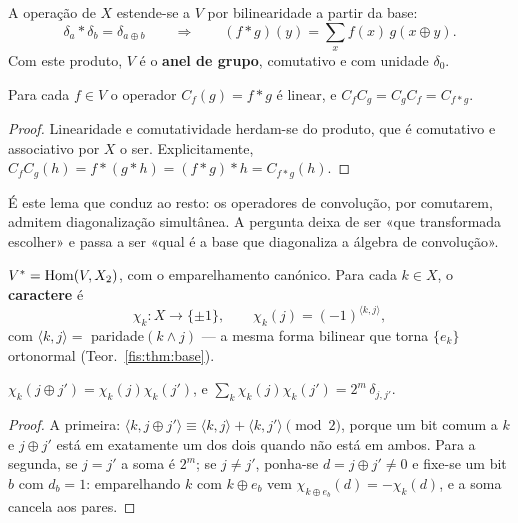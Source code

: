 \documentclass[livro.tex]{subfiles}
\begin{document}
\begin{definicao}[convolução]\label{fis:def:conv}
A operação de $X$ estende-se a $V$ por bilinearidade a partir da base:
\[
\delta_a*\delta_b=\delta_{a\oplus b}
\qquad\Longrightarrow\qquad
(f*g)(y)=\sum_{x}f(x)\,g(x\oplus y).
\]
Com este produto, $V$ é o \textbf{anel de grupo}, comutativo e com unidade
$\delta_0$.
\end{definicao}

\begin{lema}\label{fis:lem:comuta}
Para cada $f\in V$ o operador $C_f(g)=f*g$ é linear, e
$C_fC_g=C_gC_f=C_{f*g}$.
\end{lema}

\begin{proof}
Linearidade e comutatividade herdam-se do produto, que é comutativo e
associativo por $X$ o ser. Explicitamente,
$C_fC_g(h)=f*(g*h)=(f*g)*h=C_{f*g}(h)$.
\end{proof}

\medskip\noindent É este lema que conduz ao resto: os operadores de convolução,
por comutarem, admitem diagonalização simultânea. A pergunta deixa de ser «que
transformada escolher» e passa a ser «qual é a base que diagonaliza a álgebra de
convolução».

\begin{definicao}\label{fis:def:dual}
$V^{*}=\operatorname{Hom}(V,X_2)$, com o emparelhamento canónico. Para cada
$k\in X$, o \textbf{caractere} é
\[
\chi_k\colon X\to\{\pm1\},\qquad \chi_k(j)=(-1)^{\langle k,j\rangle},
\]
com $\langle k,j\rangle=$ paridade$(k\wedge j)$ --- a mesma forma bilinear que
torna $\{e_k\}$ ortonormal (Teor.~\ref{fis:thm:base}).
\end{definicao}

\begin{lema}[ortogonalidade]\label{fis:lem:orto}
$\chi_k(j\oplus j')=\chi_k(j)\chi_k(j')$, e
$\sum_k \chi_k(j)\chi_k(j')=2^{m}\,\delta_{j,j'}$.
\end{lema}

\begin{proof}
A primeira: $\langle k,j\oplus j'\rangle\equiv\langle k,j\rangle+\langle k,j'\rangle
\pmod 2$, porque um bit comum a $k$ e $j\oplus j'$ está em exatamente um dos dois
quando não está em ambos. Para a segunda, se $j=j'$ a soma é $2^{m}$; se
$j\neq j'$, ponha-se $d=j\oplus j'\neq0$ e fixe-se um bit $b$ com $d_b=1$:
emparelhando $k$ com $k\oplus e_b$ vem $\chi_{k\oplus e_b}(d)=-\chi_k(d)$, e a
soma cancela aos pares.
\end{proof}
\end{document}
